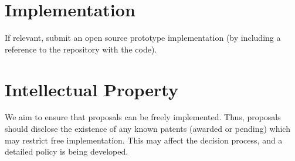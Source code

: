 \documentclass{article}
\begin{document}
\section{Implementation}			%
	If relevant, submit an open source prototype implementation (by including a reference to the repository with the code).
	
\section {Intellectual Property}	%
	We aim to ensure that proposals can be freely implemented. Thus, proposals should disclose the existence of any known patents (awarded or pending) which may restrict free implementation. This may affect the decision process, and a detailed policy is being developed.

%
%
\end{document}

